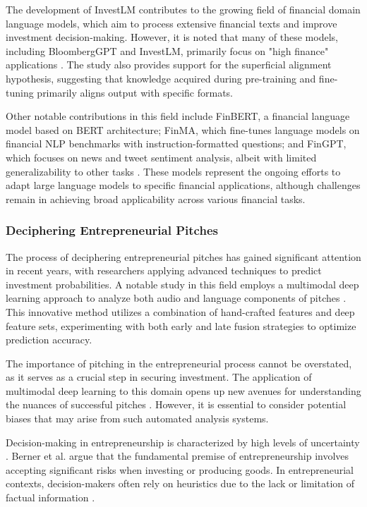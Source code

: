 \documentclass[a4paper, oneside]{discothesis}
\begin{document}
The development of InvestLM contributes to the growing field of financial domain language models, which aim to process extensive financial texts and improve investment decision-making. However, it is noted that many of these models, including BloombergGPT and InvestLM, primarily focus on "high finance" applications \cite{yang2023investlm}. The study also provides support for the superficial alignment hypothesis, suggesting that knowledge acquired during pre-training and fine-tuning primarily aligns output with specific formats.

Other notable contributions in this field include FinBERT, a financial language model based on BERT architecture; FinMA, which fine-tunes language models on financial NLP benchmarks with instruction-formatted questions; and FinGPT, which focuses on news and tweet sentiment analysis, albeit with limited generalizability to other tasks \cite{araci2019finbert, liu2023finma, yang2023fingpt}. These models represent the ongoing efforts to adapt large language models to specific financial applications, although challenges remain in achieving broad applicability across various financial tasks.

\subsubsection{Deciphering Entrepreneurial Pitches}

The process of deciphering entrepreneurial pitches has gained significant attention in recent years, with researchers applying advanced techniques to predict investment probabilities. A notable study in this field employs a multimodal deep learning approach to analyze both audio and language components of pitches \cite{multimodal_pitch_analysis}. This innovative method utilizes a combination of hand-crafted features and deep feature sets, experimenting with both early and late fusion strategies to optimize prediction accuracy.

The importance of pitching in the entrepreneurial process cannot be overstated, as it serves as a crucial step in securing investment. The application of multimodal deep learning to this domain opens up new avenues for understanding the nuances of successful pitches \cite{pitch_importance}. However, it is essential to consider potential biases that may arise from such automated analysis systems.

Decision-making in entrepreneurship is characterized by high levels of uncertainty \cite{uncertainty_entrepreneurship}. Berner et al. \cite{berner_entrepreneurship} argue that the fundamental premise of entrepreneurship involves accepting significant risks when investing or producing goods. In entrepreneurial contexts, decision-makers often rely on heuristics due to the lack or limitation of factual information \cite{heuristics_entrepreneurship}.
\end{document}
